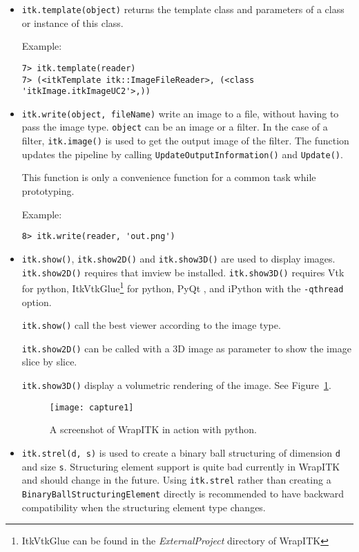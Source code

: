 \documentclass{InsightArticle}
\begin{document}
\begin{itemize}
  \item \verb$itk.template(object)$ returns the template class and parameters
of a class or instance of this class.

Example:
\begin{verbatim}
7> itk.template(reader)
7> (<itkTemplate itk::ImageFileReader>, (<class 'itkImage.itkImageUC2'>,))
\end{verbatim}

  \item \verb$itk.write(object, fileName)$ write an image to a file, without
having to pass the image type.
\verb$object$ can be an image or a filter. In the case of a filter, \verb$itk.image()$ is used
to get the output image of the filter. The function updates the pipeline by calling
\verb$UpdateOutputInformation()$ and \verb$Update()$.

This function is only a convenience function for a common task while prototyping.

Example:
\begin{verbatim}
8> itk.write(reader, 'out.png')
\end{verbatim}

  \item \verb$itk.show()$, \verb$itk.show2D()$ and \verb$itk.show3D()$ are used to
display images. \verb$itk.show2D()$ requires that imview \cite{ImviewWebSite} be installed.
\verb$itk.show3D()$ requires Vtk for python, ItkVtkGlue\footnote{ItkVtkGlue can be found in
the {\em ExternalProject} directory of WrapITK} for python, PyQt \cite{PyQtWebSite}, and iPython
\cite{IPythonWebSite} with the \verb$-qthread$ option.

\verb$itk.show()$ call the best viewer according to the image type.

\verb$itk.show2D()$
can be called with a 3D image as parameter to show the image slice by slice.

\verb$itk.show3D()$ display a volumetric rendering of the image. See Figure~\ref{screenshot}.

\begin{figure}[htbp]
\centering
\texttt{[image: capture1]}
\caption{A screenshot of WrapITK in action with python.\label{screenshot}}
\end{figure}

  \item \verb$itk.strel(d, s)$ is used to create a binary ball structuring of dimension
\verb$d$ and size \verb$s$. Structuring element support is quite bad currently in WrapITK
and should change in the future. Using \verb$itk.strel$ rather than creating a
\verb$BinaryBallStructuringElement$ directly is recommended to have backward compatibility
when the structuring element type changes.


\end{itemize}
\end{document}
